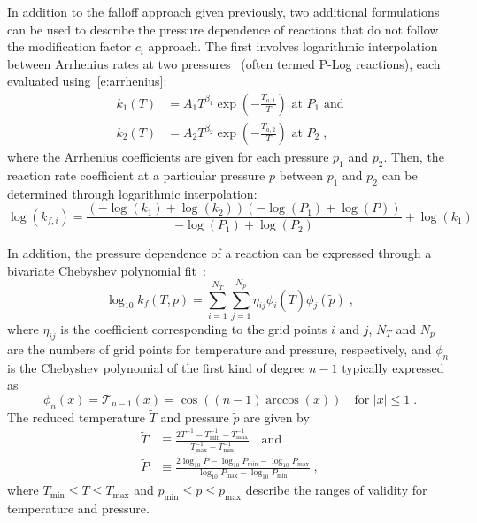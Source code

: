 \documentclass[12pt,number,sort&compress]{elsarticle}
\begin{document}
In addition to the falloff approach given previously, two additional formulations can be used to describe the pressure dependence of reactions that do not follow the modification factor $c_i$ approach.
The first involves logarithmic interpolation between Arrhenius rates at two pressures~\cite{chemkin:2012,Goodwin:2015aa} (often termed P-Log reactions), each evaluated using~\cref{e:arrhenius}:
\begin{align}
k_1 (T) &= A_1 T^{\beta_1} \exp \left( -\frac{T_{a, 1}}{T} \right) \text{ at } P_1 \text{ and} \label{e:plog_k1} \\
k_2 (T) &= A_2 T^{\beta_2} \exp \left( -\frac{T_{a, 2}}{T} \right) \text{ at } P_2 \;, \label{e:plog_k2}
\end{align}
where the Arrhenius coefficients are given for each pressure $p_1$ and $p_2$.
Then, the reaction rate coefficient at a particular pressure $p$ between $p_1$ and $p_2$ can be determined through logarithmic interpolation:
\begin{equation}
\label{e:kf_plog}
\log{\left ({k_{f, i}} \right )} = \frac{\left(- \log{\left (k_{1} \right )} + \log{\left (k_{2} \right )}\right) \left(- \log{\left (P_{1} \right )} + \log{\left (P \right )}\right)}{- \log{\left (P_{1} \right )} + \log{\left (P_{2} \right )}} + \log{\left (k_{1} \right )}
\end{equation}

In addition, the pressure dependence of a reaction can be expressed through a bivariate Chebyshev polynomial fit~\cite{Venkatesh:1997hv,Venkatesh:1997ik,Venkatesh:2000gj,chemkin:2012,Goodwin:2015aa}:
\begin{equation}
\label{e:kf_cheb}
\log_{10} k_f (T, p) = \sum_{i = 1}^{N_T} \sum_{j = 1}^{N_p} \eta_{ij} \phi_i (\tilde{T}) \phi_j \left(\tilde{p}\right) \;,
\end{equation}
where $\eta_{ij}$ is the coefficient corresponding to the grid points $i$ and $j$, $N_T$ and $N_p$ are the numbers of grid points for temperature and pressure, respectively, and $\phi_n$ is the Chebyshev polynomial of the first kind of degree $n - 1$ typically expressed as
\begin{equation}
\phi_n (x) = \mathcal{T}_{n-1} (x) = \cos \left( (n - 1) \arccos (x) \right) \quad \text{for } |x| \leq 1 \;.
\end{equation}
The reduced temperature $\tilde{T}$ and pressure $\tilde{p}$ are given by
\begin{align}
\tilde{T} &\equiv \frac{2 T^{-1} - T^{-1}_{\min} - T^{-1}_{\max}}{T^{-1}_{\max} - T^{-1}_{\min}} \quad\text{and} \\
\tilde{P} &\equiv \frac{2\log_{10} P - \log_{10} P_{\min} - \log_{10} P_{\max}}{\log_{10} P_{\max} - \log_{10} P_{\min}} \;,
\end{align}
where $T_{\min} \leq T \leq T_{\max}$ and $p_{\min} \leq p \leq p_{\max}$ describe the ranges of validity for temperature and pressure.
\end{document}
